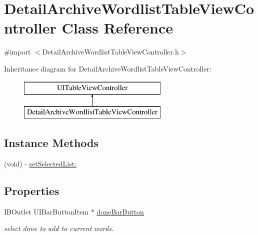 \hypertarget{interface_detail_archive_wordlist_table_view_controller}{\section{Detail\+Archive\+Wordlist\+Table\+View\+Controller Class Reference}
\label{interface_detail_archive_wordlist_table_view_controller}
}


{\ttfamily \#import $<$Detail\+Archive\+Wordlist\+Table\+View\+Controller.\+h$>$}

Inheritance diagram for Detail\+Archive\+Wordlist\+Table\+View\+Controller\+:\begin{figure}[H]
\begin{center}
\leavevmode
\includegraphics[height=2.000000cm]{interface_detail_archive_wordlist_table_view_controller}
\end{center}
\end{figure}
\subsection*{Instance Methods}
\begin{DoxyCompactItemize}
\item 
(void) -\/ \hyperlink{interface_detail_archive_wordlist_table_view_controller_a10e11c9e270362b8ef04f8a48b7196b2}{set\+Selected\+List\+:}
\end{DoxyCompactItemize}
\subsection*{Properties}
\begin{DoxyCompactItemize}
\item 
\hypertarget{interface_detail_archive_wordlist_table_view_controller_a2cfd87941a4f3b9381f434f9a3326229}{I\+B\+Outlet U\+I\+Bar\+Button\+Item $\ast$ \hyperlink{interface_detail_archive_wordlist_table_view_controller_a2cfd87941a4f3b9381f434f9a3326229}{done\+Bar\+Button}}\label{interface_detail_archive_wordlist_table_view_controller_a2cfd87941a4f3b9381f434f9a3326229}

\begin{DoxyCompactList}\small\item\em select done to add to current words. \end{DoxyCompactList}\end{DoxyCompactItemize}


